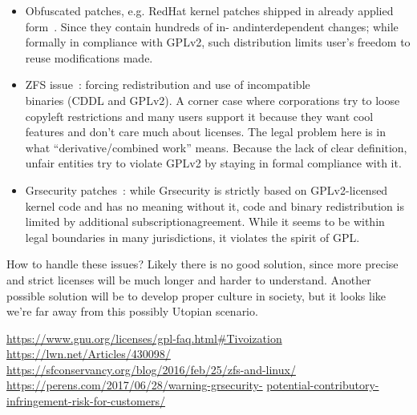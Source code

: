 \documentclass[10pt, a5paper]{article}
\begin{document}
\begin{itemize}
  \item Obfuscated patches, e.g. RedHat kernel patches shipped in already applied form~\cite{Savchenko-2}. Since they contain hundreds of in- and\linebreak interdependent changes; while formally in compliance with GPLv2, such distribution limits user's freedom to reuse modifications made.
  \item ZFS issue~\cite{Savchenko-3}: forcing redistribution and use of incompatible\\ binaries (CDDL and GPLv2). A corner case where corporations try to loose copyleft restrictions and many users support it because they want cool features and don't care much about licenses. The legal problem here is in what ``derivative/combined work'' means. Because the lack of clear definition, unfair entities try to violate GPLv2 by staying in formal compliance with it.
  \item Grsecurity patches~\cite{Savchenko-4}: while Grsecurity is strictly based on GPLv2-licensed kernel code and has no meaning without it, code and binary redistribution is limited by additional subscription\linebreak agreement. While it seems to be within legal boundaries in many jurisdictions, it violates the spirit of GPL.
\end{itemize}

How to handle these issues? Likely there is no good solution, since more precise and strict licenses will be much longer and harder to understand. Another possible solution will be to develop proper culture in society, but it looks like we're far away from this possibly Utopian scenario.

\begin{thebibliography}{20}
\url{https://www.gnu.org/licenses/gpl-faq.html\#Tivoization}
\url{https://lwn.net/Articles/430098/}
\url{https://sfconservancy.org/blog/2016/feb/25/zfs-and-linux/}
\url{https://perens.com/2017/06/28/warning-grsecurity-} \url{potential-contributory-infringement-risk-for-customers/}
\end{thebibliography}
\end{document}
